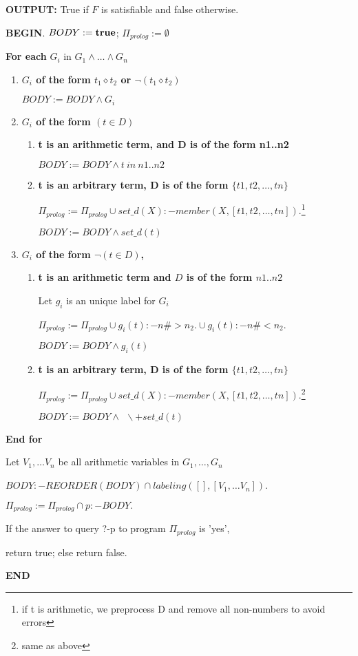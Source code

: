 \documentclass[a4paper,10pt]{article}
\begin{document}
\textbf{OUTPUT:} True if $F$ is satisfiable and false otherwise.

\textbf{BEGIN}.
$BODY := {\bf true}$;
$\Pi_{prolog} := \emptyset$

\textbf{For each} $G_i$ in $G_1 \land \dots \land G_n$
\begin{enumerate}
 \item \textbf{$G_i$   of the form $t_1 \diamond t_2$ or $\neg(t_1 \diamond t_2)$} 

  $BODY := BODY \land G_i$ 


 \item\textbf{$G_i$   of the form $(t\in D)$}
\begin{enumerate} 
 \item \textbf{t is an arithmetic term, and D is of the form n1..n2}

   $BODY := BODY \land  t~in~n1..n2$ 

 \item \textbf{t is an arbitrary term, D is  of the form $\{t1,t2,\dots,tn\}$}

    $\Pi_{prolog} := \Pi_{prolog} \cup set\_d(X):-member(X,[t1,t2,\dots,tn]).$\footnote{if t is arithmetic, we preprocess D and remove all non-numbers to avoid errors}
  
    $BODY := BODY \land set\_d(t)$ 

\end{enumerate}

\item \textbf{$G_i$   of the form $\neg(t\in D)$,}



\begin{enumerate}
\item \textbf{t is an arithmetic term and $D$ is of the form $n1..n2$}
      
      Let $g_i$ is an unique label for $G_i$
      
      $\Pi_{prolog} := \Pi_{prolog} \cup g_i(t) :- n\#>n_2. \cup g_i(t) :- n\#<n_2$.
  
      $BODY := BODY \land  g_i(t)$ 

\item \textbf{t is an arbitrary term, D is  of the form $\{t1,t2,\dots,tn\}$}

 $\Pi_{prolog} := \Pi_{prolog} \cup set\_d(X):-member(X,[t1,t2,\dots,tn]).$\footnote{same as above}
  
    $BODY := BODY \land ~~\backslash+ set\_d(t)$ 
    
\end{enumerate}

\end{enumerate}
\textbf{End for} 


\noindent
Let $V_1,\dots V_n$ be all arithmetic variables in $G_1,\dots,G_n$

$BODY:-REORDER(BODY) \cap labeling([],[V_1,\dots V_n])$.

$\Pi_{prolog} := \Pi_{prolog}  \cap  p :-BODY.$

If the answer to query ?-p to program  $\Pi_{prolog}$ is 'yes', 

return true; else return false. 

\vspace{0.3cm}
\noindent
\textbf{END}
\end{document}
